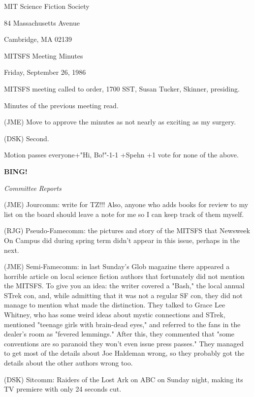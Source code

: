 \documentclass[12pt]{article}
\newcommand{\bing}{{\bf BING!} }
\newcommand{\goto}[1]{\bing \vskip 12pt \centerline{{\em{#1}}}}
\begin{document}
\begin{center}

MIT Science Fiction Society 

84 Massachusetts Avenue

Cambridge, MA 02139

\vspace{12pt}

MITSFS Meeting Minutes 

Friday, September 26, 1986

\end{center}
 
\vspace{18pt}

\setlength{\parskip}{6pt}

\noindent
MITSFS meeting called to order, 1700 SST,
Susan Tucker, Skinner, presiding.

Minutes of the previous meeting read.

(JME) Move to approve the minutes as not nearly as exciting as my surgery.

(DSK) Second.

Motion passes everyone+"Hi, Bo!"-1-1 +Spehn +1 vote for none of the above.

\goto{Committee Reports}

(JME) Jourcomm: write for TZ!!! Also, anyone who adds books for review to my list on the board should leave a note for me so I can keep track of them myself.

(RJG) Pseudo-Famecomm: the pictures and story of the MITSFS that Newsweek On Campus did during spring term didn't appear in this issue, perhaps in the next.

(JME) Semi-Famecomm: in last Sunday's Glob magazine there appeared a horrible article on local science fiction authors that fortunately did not mention the MITSFS. To give you an idea: the writer covered a "Bash," the local annual STrek con, and, while admitting that it was not a regular SF con, they did not manage to mention what made the distinction. They talked to Grace Lee Whitney, who has some weird ideas about mystic connections and STrek, mentioned "teenage girls with brain-dead eyes," and referred to the fans in the dealer's room as "fevered lemmings." After this, they commented that "some conventions are so paranoid they won't even issue press passes." They managed to get most of the details about Joe Haldeman wrong, so they probably got the details about the other authors wrong too.

(DSK) Sitcomm: Raiders of the Lost Ark on ABC on Sunday night, making its TV premiere with only 24 seconds cut.
\end{document}
